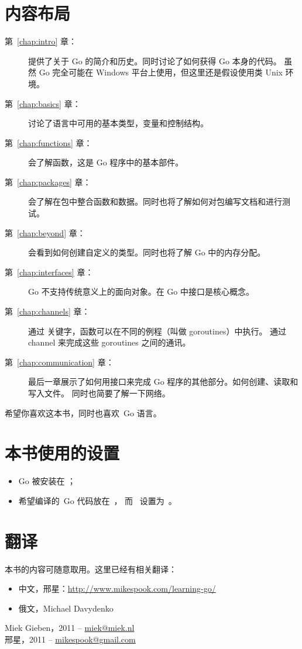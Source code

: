 \section*{内容布局}
\begin{description}
\item[第~\ref{chap:intro} 章：]
提供了关于 Go 的简介和历史。同时讨论了如何获得 Go 本身的代码。
虽然 Go 完全可能在 Windows 平台上使用，但这里还是假设使用类 Unix 环境。

\item[第~\ref{chap:basics} 章：]
讨论了语言中可用的基本类型，变量和控制结构。

\item[第~\ref{chap:functions} 章：]
会了解函数，这是 Go 程序中的基本部件。

\item[第~\ref{chap:packages} 章：]
会了解在包中整合函数和数据。同时也将了解如何对包编写文档和进行测试。

\item[第~\ref{chap:beyond} 章：]
会看到如何创建自定义的类型。同时也将了解 Go 中的内存分配。

\item[第~\ref{chap:interfaces} 章：]
Go 不支持传统意义上的面向对象。在 Go 中接口是核心概念。

\item[第~\ref{chap:channels} 章：]
通过  关键字，函数可以在不同的例程（叫做 goroutines）中执行。
通过 channel 来完成这些 goroutines 之间的通讯。

\item[第~\ref{chap:communication} 章：]
最后一章展示了如何用接口来完成 Go 程序的其他部分。如何创建、读取和写入文件。
同时也简要了解一下网络。
\end{description}

希望你喜欢这本书，同时也喜欢~Go 语言。

\section{本书使用的设置}
\label{sec:settings used}
\begin{itemize}                            
\item Go 被安装在 ；
\item 希望编译的~Go 代码放在~， 
而~ 设置为~。
\end{itemize}

\section*{翻译}
本书的内容可随意取用。这里已经有相关翻译：
\begin{itemize}
\item 中文，邢星：\url{http://www.mikespook.com/learning-go/}
\item 俄文，Michael Davydenko
\end{itemize}

\begin{raggedright}
Miek Gieben，2011 -- \url{miek@miek.nl}\\
邢星，2011 -- \url{mikespook@gmail.com}
\end{raggedright}
